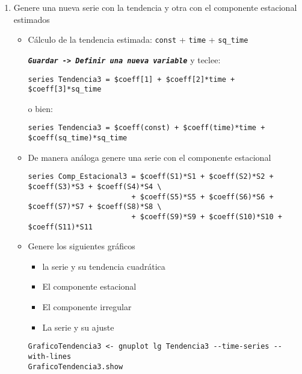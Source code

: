 \documentclass[11pt]{article}
\begin{document}
\begin{enumerate}
\item Genere una nueva serie con la tendencia y otra con el componente estacional estimados
\label{sec:org378ef14}
\begin{itemize}
\item Cálculo de la tendencia estimada:  \texttt{const} +  \texttt{time} +  \texttt{sq\_time}

\textbf{\emph{\texttt{Guardar -> Definir una nueva variable}}} y teclee:
{\vspace{1pt} \footnotesize \color{gray!70!black} \color{gray!70!black}
\begin{verbatim}
series Tendencia3 = $coeff[1] + $coeff[2]*time + $coeff[3]*sq_time
\end{verbatim}
}
o bien:
{\vspace{1pt} \footnotesize \color{gray!70!black} \color{gray!70!black}
\begin{verbatim}
series Tendencia3 = $coeff(const) + $coeff(time)*time + $coeff(sq_time)*sq_time
\end{verbatim}
}

\item De manera análoga genere una serie con el componente estacional

{\vspace{1pt} \footnotesize \color{gray!70!black} \color{gray!70!black}
\begin{verbatim}
series Comp_Estacional3 = $coeff(S1)*S1 + $coeff(S2)*S2 + $coeff(S3)*S3 + $coeff(S4)*S4 \
                        + $coeff(S5)*S5 + $coeff(S6)*S6 + $coeff(S7)*S7 + $coeff(S8)*S8 \
                        + $coeff(S9)*S9 + $coeff(S10)*S10 + $coeff(S11)*S11 
\end{verbatim}
}

\item Genere los siguientes gráficos
\begin{itemize}
\item la serie y su tendencia cuadrática

\item El componente estacional

\item El componente irregular

\item La serie y su ajuste
\end{itemize}

{\vspace{1pt} \footnotesize \color{gray!70!black} \color{gray!70!black}
\begin{verbatim}
GraficoTendencia3 <- gnuplot lg Tendencia3 --time-series --with-lines
GraficoTendencia3.show


\end{verbatim}}
\end{itemize}
\end{enumerate}
\end{document}
